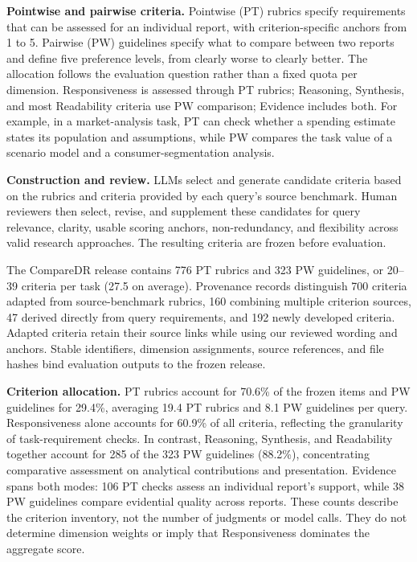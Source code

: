 \documentclass{article}
\begin{document}
\textbf{Pointwise and pairwise criteria.}
Pointwise (PT) rubrics specify requirements that can be assessed for an individual report, with criterion-specific anchors from 1 to 5. Pairwise (PW) guidelines specify what to compare between two reports and define five preference levels, from clearly worse to clearly better. The allocation follows the evaluation question rather than a fixed quota per dimension. Responsiveness is assessed through PT rubrics; Reasoning, Synthesis, and most Readability criteria use PW comparison; Evidence includes both. For example, in a market-analysis task, PT can check whether a spending estimate states its population and assumptions, while PW compares the task value of a scenario model and a consumer-segmentation analysis.

\textbf{Construction and review.}
LLMs select and generate candidate criteria based on the rubrics and criteria provided by each query's source benchmark. Human reviewers then select, revise, and supplement these candidates for query relevance, clarity, usable scoring anchors, non-redundancy, and flexibility across valid research approaches. The resulting criteria are frozen before evaluation.

The CompareDR release contains 776 PT rubrics and 323 PW guidelines, or 20--39 criteria per task (27.5 on average). Provenance records distinguish 700 criteria adapted from source-benchmark rubrics, 160 combining multiple criterion sources, 47 derived directly from query requirements, and 192 newly developed criteria. Adapted criteria retain their source links while using our reviewed wording and anchors. Stable identifiers, dimension assignments, source references, and file hashes bind evaluation outputs to the frozen release.

\textbf{Criterion allocation.}
PT rubrics account for 70.6\% of the frozen items and PW guidelines for 29.4\%, averaging 19.4 PT rubrics and 8.1 PW guidelines per query. Responsiveness alone accounts for 60.9\% of all criteria, reflecting the granularity of task-requirement checks. In contrast, Reasoning, Synthesis, and Readability together account for 285 of the 323 PW guidelines (88.2\%), concentrating comparative assessment on analytical contributions and presentation. Evidence spans both modes: 106 PT checks assess an individual report's support, while 38 PW guidelines compare evidential quality across reports. These counts describe the criterion inventory, not the number of judgments or model calls. They do not determine dimension weights or imply that Responsiveness dominates the aggregate score.
\end{document}
